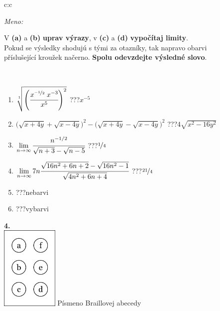 \documentclass[10pt]{report}
\begin{document}
\begin{tabular}{c:c}
\begin{minipage}[c][104.5mm][t]{0.5\linewidth}
\begin{center}
\textit{Meno:}\phantom{xxxxxxxxxxxxxxxxxxxxxxxxxxxxxxxxxxxxxxxxxxxxxxxxxxxxxxxxxxxxxxxxx}\\[5mm]
\begin{minipage}{0.95\linewidth}
\begin{center}
V \textbf{(a)} a \textbf{(b)} \textbf{uprav výrazy}, v \textbf{(c)} a \textbf{(d)} \textbf{vypočítaj limity}.\\Pokud se výsledky shodujú s tými za otazníky, tak napravo obarvi\\příslušející kroužek načerno. \textbf{Spolu odevzdejte výsledné slovo}.
\end{center}
\end{minipage}
\\[1mm]
\begin{minipage}{0.79\linewidth}
\begin{center}
\begin{varwidth}{\linewidth}
\begin{enumerate}
\small
\item $\sqrt[1]{\left(\cfrac{x^{\nicefrac{-1}{2}}\;x^{-3}}{x^{5}}\right)^{2}}$\quad \dotfill\; ???\;\dotfill \quad $x^{-5}$
\item {\footnotesize{\scriptsize$\big(\sqrt{x+4y}+\sqrt{x-4y}\big)^2-\big(\sqrt{x+4y}-\sqrt{x-4y}\big)^2$}\quad \dotfill\; ???\;\dotfill \quad $4\sqrt{x^2-16y^2}$}
\item $\lim\limits_{n\to\infty}\cfrac{n^{-1/2}}{\sqrt{n+3}-\sqrt{n-5}}$\quad \dotfill\; ???\;\dotfill \quad $\nicefrac{1}{4}$
\item $\lim\limits_{n\to\infty}7n\cfrac{\sqrt{16n^2+6n+2}-\sqrt{16n^2-1}}{\sqrt{4n^2+6n+4}}$\quad \dotfill\; ???\;\dotfill \quad $\nicefrac{21}{4}$
\item \quad \dotfill\; ???\;\dotfill \quad nebarvi
\item \quad \dotfill\; ???\;\dotfill \quad vybarvi
\end{enumerate}
\end{varwidth}
\end{center}
\end{minipage}
\begin{minipage}{0.20\linewidth}
\begin{center}
{\Huge\bfseries 4.} \\[2mm]
\includegraphics[height=40mm]{../images/braille.png}
{\small Písmeno Braillovej abecedy}
\end{center}
\end{minipage}
\end{center}
\end{minipage}
%
\end{tabular}
\end{document}
